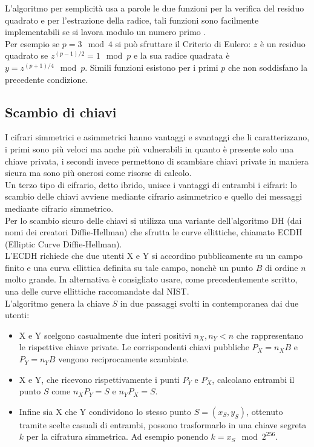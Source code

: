 \documentclass{article}
\begin{document}
	L'algoritmo per semplicità usa a parole le due funzioni per la verifica del residuo quadrato
	e per l'estrazione della radice, tali funzioni sono facilmente implementabili se si lavora
	modulo un numero primo \cite{Akif}.\\
	
	Per esempio se $p = 3 \mod 4$ si può sfruttare il Criterio di Eulero: $z$ è un residuo quadrato se $z^{(p-1)/2} = 1 \mod p$ e la sua radice quadrata è $y = z^{(p+1)/4} \mod p$.
	Simili funzioni esistono per i primi $p$ che non soddisfano la precedente condizione.
	
	\subsection{Scambio di chiavi}
	
	I cifrari simmetrici e asimmetrici hanno vantaggi e svantaggi che li caratterizzano,
	i primi sono più veloci ma anche più vulnerabili in quanto è presente solo una chiave privata,
	i secondi invece permettono di scambiare chiavi private in maniera sicura ma sono più onerosi come risorse di calcolo.\\
	
	Un terzo tipo di cifrario, detto ibrido, unisce i vantaggi di entrambi i cifrari:
	lo scambio delle chiavi avviene mediante cifrario asimmetrico e quello dei messaggi mediante 
	cifrario simmetrico.\\
	
	Per lo scambio sicuro delle chiavi si utilizza una variante dell'algoritmo DH (dai nomi dei creatori Diffie-Hellman) che sfrutta le curve ellittiche, 
	chiamato ECDH (Elliptic Curve Diffie-Hellman).\\
	
	L'ECDH richiede che due utenti X e Y si accordino pubblicamente su un campo finito e una curva ellittica definita su tale campo, nonchè un punto $B$ di ordine $n$ molto grande. In alternativa è consigliato usare, come precedentemente scritto, una delle curve ellittiche raccomandate dal NIST\cite{NIST}.\\
	
	L'algoritmo genera la chiave $S$ in due passaggi svolti in contemporanea dai due utenti:
	
	\begin{itemize}
		\item X e Y scelgono casualmente due interi positivi $n_{X}, n_{Y} < n$ che rappresentano le rispettive chiave private. 
		Le corrispondenti chiavi pubbliche $P_{X} = n_{X}B$ e $P_{Y} = n_{Y}B$ vengono reciprocamente scambiate.  
		\item X e Y, che ricevono rispettivamente i punti $P_{Y}$ e $P_{X}$, calcolano entrambi 
		il punto $S$ come $n_{X}P_{Y} = S$ e $n_{Y}P_{X} = S$.	
		\item Infine sia X che Y condividono lo stesso punto $S = (x_{S}, y_{S})$, ottenuto tramite scelte casuali di entrambi, possono trasformarlo in una chiave segreta $k$ per la cifratura simmetrica. Ad esempio ponendo $k = x_{S} \mod 2^{256}$.
	\end{itemize}
	
\end{document}
